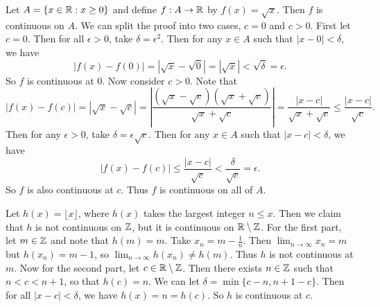 \begin{example}
  Let $A = \{x \in \mathbb{R} : x \ge 0\}$ and define $f : A \to \mathbb{R}$
  by $f(x) = \sqrt{x}$. Then $f$ is continuous on $A$.
  We can split the proof into two cases, $c = 0$ and $c > 0$.
  First let $c = 0$. Then for all $\epsilon > 0$, take
  $\delta = \epsilon^2$. Then for any $x \in A$ such that
  $|x - 0| < \delta$, we have
  \[
    |f(x) - f(0)| = |\sqrt{x} - \sqrt{0}|
    = |\sqrt{x}| < \sqrt{\delta} = \epsilon
  .\]
  So $f$ is continuous at $0$. Now consider $c > 0$. Note that
  \[|f(x) - f(c)| = |\sqrt{x} - \sqrt{c}| = \left|\frac{(\sqrt{x} - \sqrt{c})(\sqrt{x} + \sqrt{c})}{\sqrt{x} + \sqrt{c}}\right| = \frac{|x - c|}{\sqrt{x} + \sqrt{c}} \le \frac{|x - c|}{\sqrt{c}}.\]
  Then for any $\epsilon > 0$, take $\delta = \epsilon \sqrt{c}$.
  Then for any $x \in A$ such that $|x - c| < \delta$, we have
  \[
  |f(x) - f(c)| \le \frac{|x - c|}{\sqrt{c}} < \frac{\delta}{\sqrt{c}} = \epsilon
  .\]
  So $f$ is also continuous at $c$. Thus $f$ is continuous on
  all of $A$.
\end{example}

\begin{example}
  Let $h(x) = \lfloor x \rfloor$, where $h(x)$ takes the
  largest integer $n \le x$. Then we claim that $h$ is
  not continuous on $\mathbb{Z}$, but it is continuous on $\mathbb{R} \setminus \mathbb{Z}$.
  For the first part, let $m \in \mathbb{Z}$ and note that $h(m) = m$.
  Take $x_n = m - \frac{1}{n}$. Then $\lim_{n \to \infty} x_n = m$
  but $h(x_n) = m - 1$, so $\lim_{n \to \infty} h(x_n) \ne h(m)$.
  Thus $h$ is not continuous at $m$. Now for the second part,
  let $c \in \mathbb{R} \setminus \mathbb{Z}$. Then there exists $n \in \mathbb{Z}$ such
  that $n < c < n + 1$, so that $h(c) = n$. We can let
  $\delta = \min\{c - n, n + 1 - c\}$. Then for all
  $|x - c| < \delta$, we have $h(x) = n = h(c)$. So $h$ is
  continuous at $c$.
\end{example}
